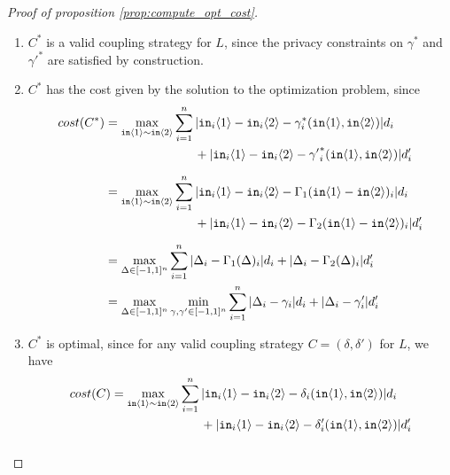 \begin{proof}[Proof of proposition \ref{prop:compute_opt_cost}]
    \begin{enumerate}
        \item $C^*$ is a valid coupling strategy for $L$, since the privacy constraints on $\gamma^*$ and ${\gamma'}^*$ are satisfied by construction.
        \item $C^*$ has the cost given by the solution to the optimization problem, since 
        \begin{align*}
            cost(C^*) &= \max_{\texttt{in}\brangle{1}\sim \texttt{in}\brangle{2}} \sum_{i = 1}^n  |\texttt{in}_i\brangle{1} - \texttt{in}_i\brangle{2} - \gamma_i^*(\texttt{in}\brangle{1}, \texttt{in}\brangle{2})| d_i \\ 
            \phantom{cost(C^*)} &\phantom{=\max_{\texttt{in}\brangle{1}\sim \texttt{in}\brangle{2}}\qquad } + |\texttt{in}_i\brangle{1} - \texttt{in}_i\brangle{2} - {\gamma'}_i^*(\texttt{in}\brangle{1}, \texttt{in}\brangle{2})|d_i' \\
            &= \max_{\texttt{in}\brangle{1}\sim \texttt{in}\brangle{2}} \sum_{i = 1}^n  |\texttt{in}_i\brangle{1} - \texttt{in}_i\brangle{2} - \Gamma_1(\texttt{in}\brangle{1} - \texttt{in}\brangle{2})_i| d_i \\ 
            \phantom{cost(C^*)} &\phantom{=\max_{\texttt{in}\brangle{1}\sim \texttt{in}\brangle{2}}\qquad } + |\texttt{in}_i\brangle{1} - \texttt{in}_i\brangle{2} - \Gamma_2(\texttt{in}\brangle{1} - \texttt{in}\brangle{2})_i|d_i' \\
            &= \max_{\Delta \in [-1, 1]^n} \sum_{i = 1}^n  |\Delta_i - \Gamma_1(\Delta)_i| d_i + |\Delta_i - \Gamma_2(\Delta)_i|d_i' \\
            &= \max_{\Delta \in [-1, 1]^n} \min_{\gamma, \gamma' \in [-1, 1]^n} \sum_{i = 1}^n  |\Delta_i - \gamma_i| d_i + |\Delta_i - \gamma_i'|d_i'
        \end{align*}
        \item $C^*$ is optimal, since for any valid coupling strategy $C = (\delta, \delta')$ for $L$, we have
        \begin{align*}
            cost(C) &= \max_{\texttt{in}\brangle{1}\sim \texttt{in}\brangle{2}} \sum_{i = 1}^n  |\texttt{in}_i\brangle{1} - \texttt{in}_i\brangle{2} - \delta_i(\texttt{in}\brangle{1}, \texttt{in}\brangle{2})| d_i \\
            \phantom{cost(C)} &\phantom{=\max_{\texttt{in}\brangle{1}\sim \texttt{in}\brangle{2}}\qquad } + |\texttt{in}_i\brangle{1} - \texttt{in}_i\brangle{2} - \delta_i'(\texttt{in}\brangle{1}, \texttt{in}\brangle{2})|d_i' \\

\end{align*}
\end{enumerate}
\end{proof}
